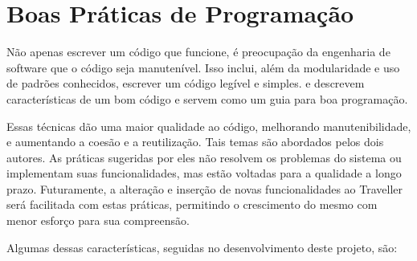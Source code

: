 \section{Boas Práticas de Programação}

Não apenas escrever um código que funcione, é preocupação da engenharia de software que o código seja manutenível. Isso inclui, além da modularidade e uso de padrões conhecidos, escrever um código legível e simples. \cite{Goodliffe2007} e \cite{McConnel2004} descrevem características de um bom código e servem como um guia para boa programação.

Essas técnicas dão uma maior qualidade ao código, melhorando manutenibilidade, e aumentando a coesão e a reutilização. Tais temas são abordados pelos dois autores. As práticas sugeridas por eles não resolvem os problemas do sistema ou implementam suas funcionalidades, mas estão voltadas para a qualidade a longo prazo. Futuramente, a alteração e inserção de novas funcionalidades ao Traveller será facilitada com estas práticas, permitindo o crescimento do mesmo com menor esforço para sua compreensão.

Algumas dessas características, seguidas no desenvolvimento deste projeto, são:

